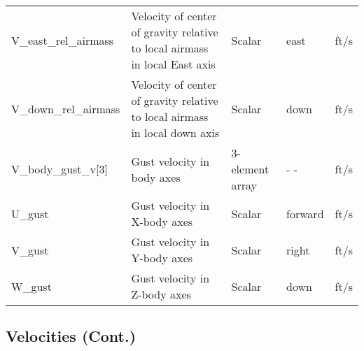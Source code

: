 \documentclass[10pt]{article}
\begin{document}
\begin{tabular}{|l|p{2.0in}|p{1.0in}|p{1.0in}|l|}
V\_east\_rel\_airmass & Velocity of center of gravity relative to local airmass in local East axis & Scalar & east & ft/s \\
V\_down\_rel\_airmass & Velocity of center of gravity relative to local airmass in local down axis & Scalar & down & ft/s \\
\hline
V\_body\_gust\_v[3] & Gust velocity in body axes & 3-element array &          - - & ft/s \\
U\_gust & Gust velocity in X-body axes & Scalar & forward & ft/s \\
V\_gust & Gust velocity in Y-body axes & Scalar & right & ft/s \\
W\_gust & Gust velocity in Z-body axes & Scalar & down & ft/s \\
\hline
\end{tabular}

\subsection{Velocities (Cont.)}
\end{document}
